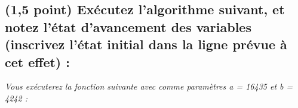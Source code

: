 \documentclass[11pt,a4paper]{article}
\begin{document}
\clearpage


\subsection{(1,5 point) Exécutez l'algorithme suivant, et notez l'état d'avancement des variables (inscrivez l'état initial dans la ligne prévue à cet effet) : }

\bigskip

\begin{center}
\textit{Vous exécuterez la fonction suivante avec comme paramètres a = 16435 et b = 4242 : }
\end{center}


\vfillFirst


\end{document}
